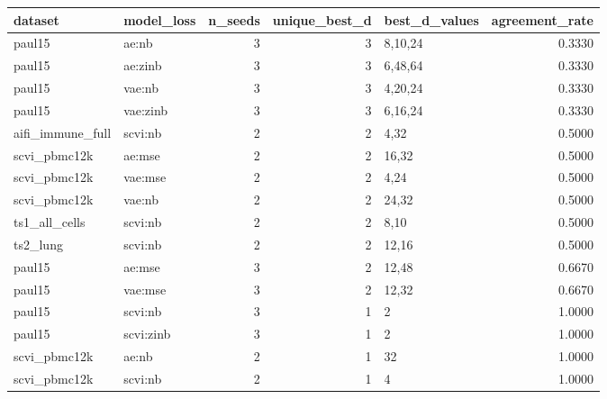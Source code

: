 \begin{tabular}{llrrlr}
\toprule
dataset & model\_loss & n\_seeds & unique\_best\_d & best\_d\_values & agreement\_rate \\
\midrule
paul15 & ae:nb & 3 & 3 & 8,10,24 & 0.3330 \\
paul15 & ae:zinb & 3 & 3 & 6,48,64 & 0.3330 \\
paul15 & vae:nb & 3 & 3 & 4,20,24 & 0.3330 \\
paul15 & vae:zinb & 3 & 3 & 6,16,24 & 0.3330 \\
aifi\_immune\_full & scvi:nb & 2 & 2 & 4,32 & 0.5000 \\
scvi\_pbmc12k & ae:mse & 2 & 2 & 16,32 & 0.5000 \\
scvi\_pbmc12k & vae:mse & 2 & 2 & 4,24 & 0.5000 \\
scvi\_pbmc12k & vae:nb & 2 & 2 & 24,32 & 0.5000 \\
ts1\_all\_cells & scvi:nb & 2 & 2 & 8,10 & 0.5000 \\
ts2\_lung & scvi:nb & 2 & 2 & 12,16 & 0.5000 \\
paul15 & ae:mse & 3 & 2 & 12,48 & 0.6670 \\
paul15 & vae:mse & 3 & 2 & 12,32 & 0.6670 \\
paul15 & scvi:nb & 3 & 1 & 2 & 1.0000 \\
paul15 & scvi:zinb & 3 & 1 & 2 & 1.0000 \\
scvi\_pbmc12k & ae:nb & 2 & 1 & 32 & 1.0000 \\
scvi\_pbmc12k & scvi:nb & 2 & 1 & 4 & 1.0000 \\
\bottomrule
\end{tabular}
